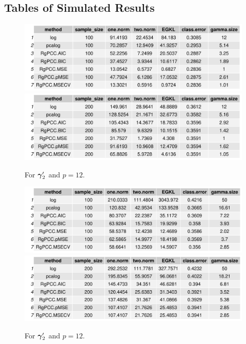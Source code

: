 \documentclass[main.tex]{subfiles}
\begin{document}
\subsection{Tables of Simulated Results}
\begin{figure}[H]
	\centering
	\includegraphics[width =  \textwidth]{simulated/(sparsity1-100,12)_metrics.pdf}
	\includegraphics[width =  \textwidth]{simulated/(sparsity1-200,12)_metrics.pdf}
	\caption{For $\boldsymbol \gamma_2'$ and $p = 12$.}
	\label{fig:simulated1-12}
\end{figure}

\begin{figure}[H]
	\centering
	\includegraphics[width =  \textwidth]{simulated/(sparsity1-100,50)_metrics.pdf}
	\includegraphics[width =  \textwidth]{simulated/(sparsity1-200,50)_metrics.pdf}
	\caption{For $\boldsymbol \gamma_2'$ and $p = 12$.}
	\label{fig:simulated1-50}
\end{figure}
\end{document}
